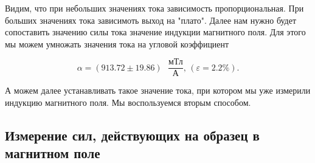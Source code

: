 \documentclass[a4paper,12pt]{article} %
\begin{document}
\begin{enumerate}
Видим, что при небольших значениях тока зависимость пропорциональная. При больших значениях тока зависимоть выход на "плато". Далее нам нужно будет сопоставить значению силы тока значение индукции магнитного поля. Для этого мы можем умножать значения тока на угловой коэффициент

\[ \alpha = (913.72 \pm 19.86) \text{ }\frac{\text{мТл}}{\text{А}} \text{, }(\varepsilon = 2.2 \%). \]

А можем далее устанавливать такое значение тока, при котором мы уже измерили индукцию магнитного поля. Мы воспользуемся вторым способом.

\end{enumerate}

\newpage

\subsection{Измерение сил, действующих на образец в магнитном поле}
\end{document}
